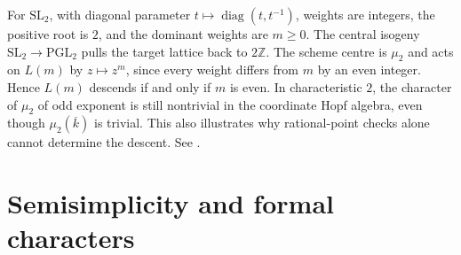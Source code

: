 \documentclass[11pt,a4paper,openany,oneside]{book}
\theoremstyle{resultstyle}
\theoremstyle{definition}
\numberwithin{equation}{chapter}
\begin{document}
For \(\mathrm{SL}_2\), with diagonal parameter \(t\mapsto\operatorname{diag}(t,t^{-1})\), weights are integers, the positive root is \(2\), and the dominant weights are \(m\geq0\). The central isogeny \(\mathrm{SL}_2\to\mathrm{PGL}_2\) pulls the target lattice back to \(2\mathbb Z\). The scheme centre is \(\mu_2\) and acts on \(L(m)\) by \(z\mapsto z^m\), since every weight differs from \(m\) by an even integer. Hence \(L(m)\) descends if and only if \(m\) is even. In characteristic \(2\), the character of \(\mu_2\) of odd exponent is still nontrivial in the coordinate Hopf algebra, even though \(\mu_2(\overline k)\) is trivial. This also illustrates why rational-point checks alone cannot determine the descent. See \cite[22.11--22.12, 22.33 and 22.35]{milne}.

\section{Semisimplicity and formal characters}
\end{document}
